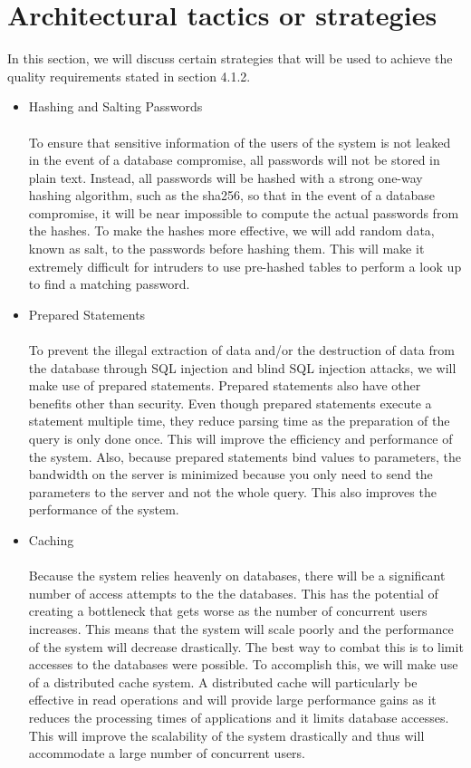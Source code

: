 \documentclass[a4paper]{article}
\begin{document}
	\section{Architectural tactics or strategies}
	In this section, we will discuss certain strategies that will be used to achieve the quality requirements stated in section 4.1.2.
	\begin{itemize}
		\item Hashing and Salting Passwords \\\\
		To ensure that sensitive information of the users of the system is not leaked in the event of a database compromise, all passwords will not be stored in plain text. Instead, all passwords will be hashed with a strong one-way hashing algorithm, such as the sha256, so that in the event of a database compromise, it will be near impossible to compute the actual passwords from the hashes. To make the hashes more effective, we will add random data, known as salt, to the passwords before hashing them. This will make it extremely difficult for intruders to use pre-hashed tables to perform a look up to find a matching password.
		\\
		\item Prepared Statements \\\\
		To prevent the illegal extraction of data and/or the destruction of data from the database through SQL injection and blind SQL injection attacks, we will make use of prepared statements. Prepared statements also have other benefits other than security. Even though prepared statements execute a statement multiple time, they reduce parsing time as the preparation of the query is only done once. This will improve the efficiency and performance of the system. Also, because prepared statements bind values to parameters, the bandwidth on the server is minimized because you only need to send the parameters to the server and not the whole query. This also improves the performance of the system.
		\\
		\item Caching \\\\
		Because the system relies heavenly on databases, there will be a significant number of access attempts to the the databases. This has the potential of creating a bottleneck that gets worse as the number of concurrent users increases. This means that the system will scale poorly and the performance of the system will decrease drastically. The best way to combat this is to limit accesses to the databases were possible. To accomplish this, we will make use of a distributed cache system. A distributed cache will particularly be effective in read operations and will provide large performance gains as it reduces the processing times of applications and it limits database accesses. This will improve the scalability of the system drastically and thus will accommodate a large number of concurrent users. 

\end{itemize}
\end{document}
